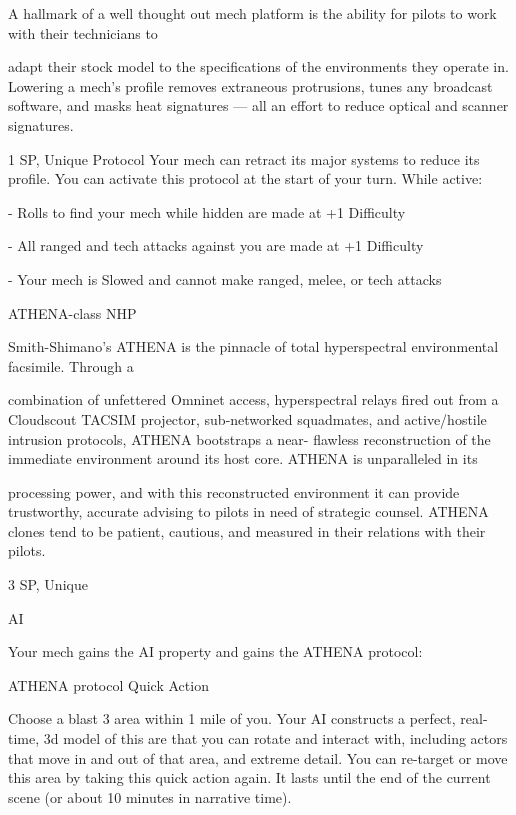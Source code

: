 A hallmark of a well thought out mech platform is the ability for pilots to work with their technicians to

adapt their stock model to the specifications of the environments they operate in. Lowering a mech’s profile
removes extraneous protrusions, tunes any broadcast software, and masks heat signatures — all an effort
to reduce optical and scanner signatures.

1 SP, Unique
Protocol
Your mech can retract its major systems to reduce its profile. You can activate this protocol at
the start of your turn. While active:

     -   Rolls to find your mech while hidden are made at +1 Difficulty

     -   All ranged and tech attacks against you are made at +1 Difficulty

     -   Your mech is Slowed and cannot make ranged, melee, or tech attacks


ATHENA-class NHP

Smith-Shimano’s ATHENA is the pinnacle of total hyperspectral environmental facsimile. Through a

combination of unfettered Omninet access, hyperspectral relays fired out from a Cloudscout TACSIM
projector, sub-networked squadmates, and active/hostile intrusion protocols, ATHENA bootstraps a near-
flawless reconstruction of the immediate environment around its host core. ATHENA is unparalleled in its

processing power, and with this reconstructed environment it can provide trustworthy, accurate advising to
pilots in need of strategic counsel.
ATHENA clones tend to be patient, cautious, and measured in their relations with their pilots.





3 SP, Unique

AI

Your mech gains the AI property and gains the ATHENA protocol:


         ATHENA protocol
          Quick Action

          Choose a blast 3 area within 1 mile of you. Your AI constructs a perfect, real-time, 3d
          model of this are that you can rotate and interact with, including actors that move in and
          out of that area, and extreme detail. You can re-target or move this area by taking this
          quick action again. It lasts until the end of the current scene (or about 10 minutes in
          narrative time).


